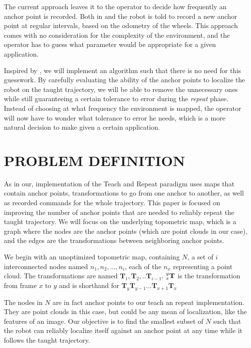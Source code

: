 \documentclass[letterpaper,10 pt,conference]{ieeeconf}
\newcommand{\mat}[1]{\mathbf{#1}}
\begin{document}
The current approach leaves it to the operator to decide how frequently an
anchor point is recorded. Both in \cite{Furgale10} and \cite{Sprunk13} the robot
is told to record a new anchor point at regular intervals, based on the odometry
of the wheels. This approach comes with no consideration for the complexity of
the environment, and the operator has to guess what parameter would be
appropriate for a given application.

Inspired by \cite{Churchill15}, we will implement an algorithm such that there
is no need for this guesswork. By carefully evaluating the ability of the anchor
points to localize the robot on the taught trajectory, we will be able to remove
the unnecessary ones while still guaranteeing a certain tolerance to error
during the \textit{repeat} phase. Instead of choosing at what frequency the
environment is mapped, the operator will now have to wonder what tolerance to
error he needs, which is a more natural decision to make given a certain
application.


\section{PROBLEM DEFINITION}

As in \cite{Sprunk13} our, implementation of the Teach and Repeat paradigm uses
maps that contain anchor points, transformations to go from one anchor to
another, as well as recorded commands for the whole trajectory. This paper is
focused on improving the number of anchor points that are needed to reliably
repeat the taught trajectory. We will focus on the underlying topometric map,
which is a graph where the nodes are the anchor points (which are point clouds
in our case), and the edges are the transformations between neighboring anchor
points.

We begin with an unoptimized topometric map, containing $N$, a set of $i$
interconnected nodes named $n_1, n_2, ..., n_{i}$, each of the $n_x$
representing a point cloud. The transformations are named $\mat{T}_1,
\mat{T}_2,.. \mat{T}_{i-1}$. $\prescript{y}{x}{\mat{T}}$ is the transformation
from frame $x$ to $y$ and is shorthand for $\mat{T}_y
\mat{T}_{y-1}...\mat{T}_{x+1} \mat{T}_x$

The nodes in $N$ are in fact anchor points to our teach an
repeat implementation. They are point clouds in this case, but could be any mean
of localization, like the features of an image. Our objective is to find the
smallest subset of $N$ such that the robot can reliably localize itself against
an anchor point at any time while it follows the taught trajectory.
\end{document}
